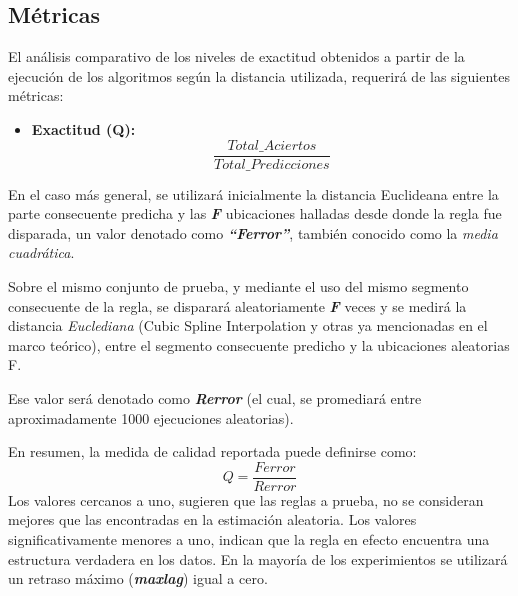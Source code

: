 \subsection{M\'etricas}
El an\'alisis comparativo de los niveles de exactitud obtenidos a partir de la ejecuci\'on de los algoritmos seg\'un la distancia utilizada, requerir\'a de las siguientes m\'etricas:
\begin{itemize}
\item \textbf{Exactitud (Q):}
\begin{equation}
 \frac{Total\_Aciertos} {Total\_Predicciones}
\end{equation}
\end{itemize}
En el caso m\'as general, se utilizar\'a inicialmente la distancia Euclideana entre la parte consecuente predicha y las \textit{\textbf{F}} ubicaciones halladas desde donde la regla fue disparada, un valor denotado como \textit{\textbf{\enquote{Ferror}}}, tambi\'en conocido como la \textit{media cuadr\'atica}.\par
Sobre el mismo conjunto de prueba, y mediante el uso del mismo segmento consecuente de la regla, se disparar\'a aleatoriamente \textit{\textbf{F}} veces y se medir\'a la distancia \textit{Euclediana} (Cubic Spline Interpolation y otras ya mencionadas en el marco te\'orico), entre el segmento consecuente predicho y la ubicaciones aleatorias F.\par
Ese valor ser\'a denotado como \textit{\textbf{Rerror}} (el cual, se promediar\'a entre aproximadamente 1000 ejecuciones aleatorias).\par
En resumen, la medida de calidad reportada puede definirse como: 
\begin{equation} 
Q = \frac{Ferror}{Rerror} 
\end{equation}
Los valores cercanos a uno, sugieren que las reglas a prueba, no se consideran mejores que las encontradas en la estimaci\'on aleatoria. Los valores significativamente menores a uno, indican que la regla en efecto encuentra una estructura verdadera en los datos. En la mayor\'ia de los experimientos se utilizar\'a un retraso m\'aximo (\textit{\textbf{maxlag}}) \cite{main} igual a cero.
